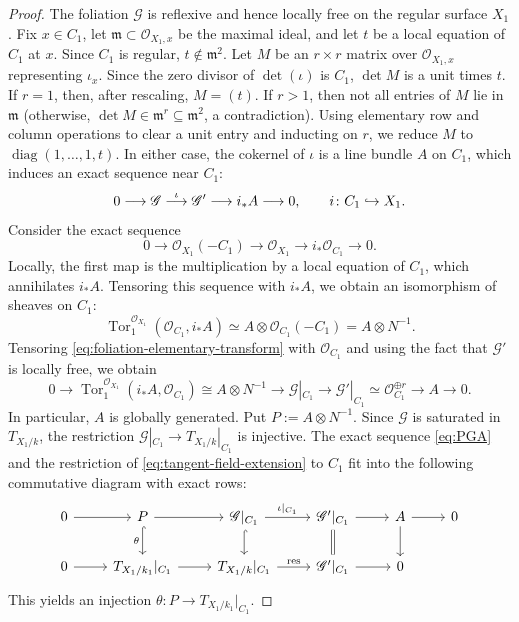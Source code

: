 \documentclass[10pt,abstract=true]{scrartcl}
\numberwithin{equation}{section}
\theoremstyle{definition}
\theoremstyle{remark}
\DeclareMathOperator\Tor{Tor}
\begin{document}
\begin{proof}
  The foliation $\mathscr G$ is reflexive and hence locally free on the regular surface $X_1$.
  Fix $x\in C_1$, let $\mathfrak m\subset\mathcal O_{X_1,x}$ be the maximal ideal, and let $t$ be a local equation of $C_1$ at $x$.
  Since $C_1$ is regular, $t\notin\mathfrak m^2$.
  Let $M$ be an $r\times r$ matrix over $\mathcal O_{X_1,x}$ representing $\iota_x$.
  Since the zero divisor of $\det(\iota)$ is $C_1$, $\det M$ is a unit times $t$.
  If $r = 1$, then, after rescaling, $M=(t)$.
  If $r > 1$, then not all entries of $M$ lie in $\mathfrak m$ (otherwise, $\det M\in\mathfrak m^r\subseteq\mathfrak m^2$, a contradiction). 
  Using elementary row and column operations to clear a unit entry and inducting on $r$, we reduce $M$ to $\operatorname{diag}(1,\ldots,1,t)$.
  In either case, the cokernel of $\iota$ is a line bundle $A$ on $C_1$, which induces an exact sequence near $C_1$:
  \begin{equation}\label{eq:foliation-elementary-transform}
    0\longrightarrow\mathscr G
    \buildrel\iota\over\longrightarrow\mathscr G'
    \longrightarrow i_*A\longrightarrow0,
    \qquad i\colon C_1\hookrightarrow X_1.
  \end{equation}
  Consider the exact sequence
  \[
    0\longrightarrow\mathcal O_{X_1}(-C_1)
    \longrightarrow\mathcal O_{X_1}
    \longrightarrow i_*\mathcal O_{C_1}
    \longrightarrow0.
  \]
  Locally, the first map is the multiplication by a local equation of $C_1$, which annihilates $i_*A$.
  Tensoring this sequence with $i_*A$, we obtain an isomorphism of sheaves on $C_1$:
  \[
    \operatorname{Tor}_1^{\mathcal O_{X_1}}(\mathcal O_{C_1},i_*A)
    \simeq A\otimes\mathcal O_{C_1}(-C_1)
    =A\otimes N^{-1}.
  \]
  Tensoring \eqref{eq:foliation-elementary-transform} with $\mathcal O_{C_1}$ and using the fact that $\mathscr G'$ is locally free, we obtain
  \begin{equation}\label{eq:PGA}
    0 \longrightarrow \Tor_1^{\mathcal O_{X_1}} (i_*A, \mathcal O_{C_1}) \cong A\otimes N^{-1}
    \longrightarrow\mathscr G|_{C_1}
    \longrightarrow\mathscr G'|_{C_1}\simeq\mathcal O_{C_1}^{\oplus r}
    \longrightarrow A\longrightarrow0.
  \end{equation}
  In particular, $A$ is globally generated.
  Put $P:=A\otimes N^{-1}$.
  Since $\mathscr G$ is saturated in $T_{X_1/k}$, the restriction $\mathscr G|_{C_1}\to T_{X_1/k}|_{C_1}$ is injective.
  The exact sequence \eqref{eq:PGA} and the restriction of \eqref{eq:tangent-field-extension} to $C_1$ fit into the following commutative diagram with exact rows:
  \[
    \begin{tikzcd}
      0 \ar[r] 
        & P \ar[r] \ar[d,hook,"\theta"']
        & \mathscr G|_{C_1} \ar[r,"\iota|_{C_1}"] \ar[d,hook]
        & \mathscr G'|_{C_1} \ar[r] \ar[d,equal]
        & A \ar[r] \ar[d]
        & 0 \\
      0 \ar[r]
        & T_{X_1/k_1}|_{C_1} \ar[r]
        & T_{X_1/k}|_{C_1} \ar[r,"\mathrm{res}"]
        & \mathscr G'|_{C_1} \ar[r]
        & 0
        & {}
    \end{tikzcd}
  \]
  This yields an injection $\theta\colon P \to T_{X_1/k_1}|_{C_1}$.


\end{proof}
\end{document}

